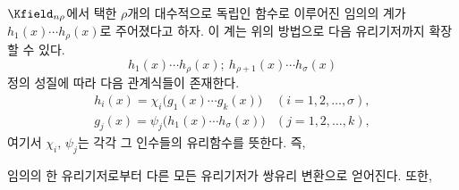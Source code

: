 
$\Kfield_{n\rho}$에서 택한 $\rho$개의 대수적으로 독립인 함수로 이루어진 임의의 계가 $h_1(x)\cdots h_\rho(x)$로 주어졌다고 하자. 이 계는 위의 방법으로 다음 유리기저까지 확장할 수 있다.
\[
h_1(x)\cdots h_\rho(x);\ h_{\rho+1}(x)\cdots h_\sigma(x)
\]
정의 성질에 따라 다음 관계식들이 존재한다.
\[
\begin{array}{ll}
h_i(x)=\chi_i\bigl(g_1(x)\cdots g_k(x)\bigr)&(i=1,2,\ldots,\sigma),\\
g_j(x)=\psi_j\bigl(h_1(x)\cdots h_\sigma(x)\bigr)&(j=1,2,\ldots,k),
\end{array}
\]
여기서 $\chi_i$, $\psi_j$는 각각 그 인수들의 유리함수를 뜻한다. 즉,

임의의 한 유리기저로부터 다른 모든 유리기저가 쌍유리 변환으로 얻어진다. 또한,
